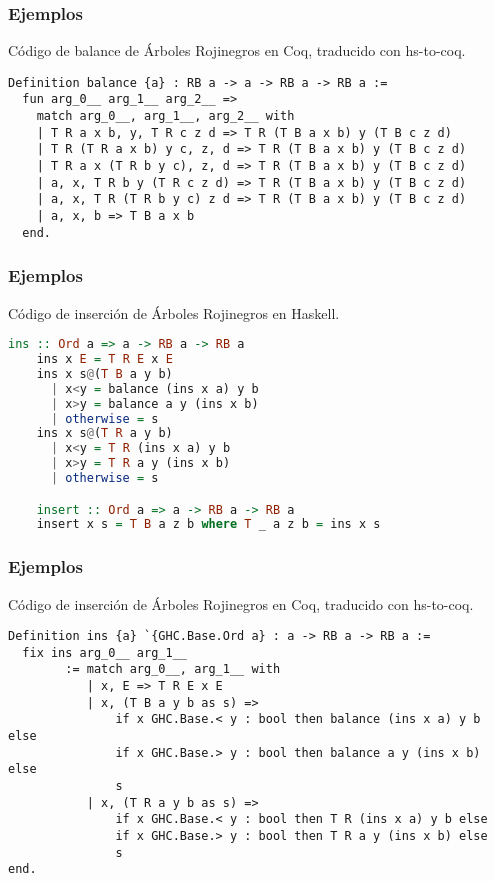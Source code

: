 \documentclass[xcolor=dvipsnames,table,handout]{beamer}
\begin{document}
\begin{frame}[fragile]
  \frametitle{Ejemplos}
  Código de balance de Árboles Rojinegros en Coq, traducido con hs-to-coq.
       \begin{lstlisting}[language=Coq]
 Definition balance {a} : RB a -> a -> RB a -> RB a :=
  fun arg_0__ arg_1__ arg_2__ =>
    match arg_0__, arg_1__, arg_2__ with
    | T R a x b, y, T R c z d => T R (T B a x b) y (T B c z d)
    | T R (T R a x b) y c, z, d => T R (T B a x b) y (T B c z d)
    | T R a x (T R b y c), z, d => T R (T B a x b) y (T B c z d)
    | a, x, T R b y (T R c z d) => T R (T B a x b) y (T B c z d)
    | a, x, T R (T R b y c) z d => T R (T B a x b) y (T B c z d)
    | a, x, b => T B a x b
  end.
       \end{lstlisting}
\end{frame}


\begin{frame}[fragile]
  \frametitle{Ejemplos}
  Código de inserción de Árboles Rojinegros en Haskell.
       \begin{lstlisting}[language=haskell]
    ins :: Ord a => a -> RB a -> RB a
    ins x E = T R E x E
    ins x s@(T B a y b)
      | x<y = balance (ins x a) y b
      | x>y = balance a y (ins x b)
      | otherwise = s
    ins x s@(T R a y b)
      | x<y = T R (ins x a) y b
      | x>y = T R a y (ins x b)
      | otherwise = s

    insert :: Ord a => a -> RB a -> RB a
    insert x s = T B a z b where T _ a z b = ins x s
       \end{lstlisting}
\end{frame}

\begin{frame}[fragile]
  \frametitle{Ejemplos}
  Código de inserción de Árboles Rojinegros en Coq, traducido con hs-to-coq.
       \begin{lstlisting}[language=Coq]
Definition ins {a} `{GHC.Base.Ord a} : a -> RB a -> RB a :=
  fix ins arg_0__ arg_1__
        := match arg_0__, arg_1__ with
           | x, E => T R E x E
           | x, (T B a y b as s) =>
               if x GHC.Base.< y : bool then balance (ins x a) y b else
               if x GHC.Base.> y : bool then balance a y (ins x b) else
               s
           | x, (T R a y b as s) =>
               if x GHC.Base.< y : bool then T R (ins x a) y b else
               if x GHC.Base.> y : bool then T R a y (ins x b) else
               s
end.
       \end{lstlisting}
\end{frame}
\end{document}
